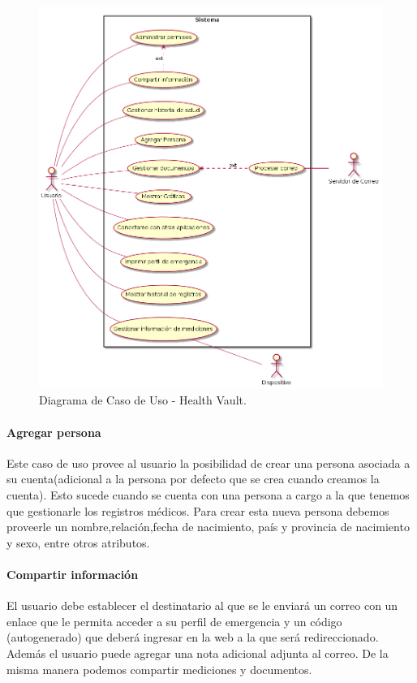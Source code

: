 \begin{figure} 
  \centering
\includegraphics[width=.9\textwidth]{img/tp1/cu-hv}
  \caption{Diagrama de Caso de Uso - Health Vault.}
  \label{casoDeUsoHV}
\end{figure}
 	
\paragraph{Agregar persona}

Este caso de uso provee al usuario la posibilidad de crear una persona asociada a su cuenta(adicional a la persona por defecto que se crea cuando creamos la cuenta). Esto sucede cuando se cuenta con una persona a cargo a la que tenemos que gestionarle los registros médicos. Para crear esta nueva persona debemos proveerle un nombre,relación,fecha de nacimiento, país y provincia de nacimiento y sexo, entre otros atributos.
 
\paragraph{Compartir información}
 
El usuario debe establecer el destinatario al que se le enviará un correo con un enlace que le permita acceder a su perfil de emergencia y un código (autogenerado) que deberá ingresar en la web a la que será redireccionado. Además el usuario puede agregar una nota adicional adjunta al correo. De la misma manera podemos compartir mediciones y documentos.

